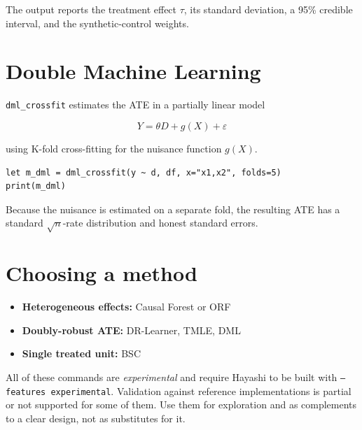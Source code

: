 The output reports the treatment effect $\tau$, its standard deviation,
a 95\% credible interval, and the synthetic-control weights.

\section{Double Machine Learning}

\texttt{dml\_crossfit} estimates the ATE in a partially linear model

\[
Y = \theta D + g(X) + \varepsilon
\]

using K-fold cross-fitting for the nuisance function $g(X)$.

\begin{lstlisting}[caption={Double Machine Learning}]
let m_dml = dml_crossfit(y ~ d, df, x="x1,x2", folds=5)
print(m_dml)
\end{lstlisting}

Because the nuisance is estimated on a separate fold, the resulting ATE
has a standard $\sqrt{n}$-rate distribution and honest standard errors.

\section{Choosing a method}

\begin{itemize}
\item \textbf{Heterogeneous effects:} Causal Forest or ORF
\item \textbf{Doubly-robust ATE:} DR-Learner, TMLE, DML
\item \textbf{Single treated unit:} BSC
\end{itemize}

All of these commands are \textit{experimental} and require Hayashi to
be built with \texttt{--features experimental}. Validation against
reference implementations is partial or not supported for some of them.
Use them for exploration and as complements to a clear design, not as
substitutes for it.
